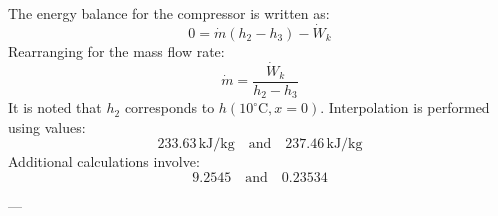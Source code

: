 The energy balance for the compressor is written as:  
\[
0 = \dot{m} (h_2 - h_3) - \dot{W}_k
\]  
Rearranging for the mass flow rate:  
\[
\dot{m} = \frac{\dot{W}_k}{h_2 - h_3}
\]  
It is noted that \( h_2 \) corresponds to \( h(10^\circ\text{C}, x = 0) \). Interpolation is performed using values:  
\[
233.63 \, \text{kJ/kg} \quad \text{and} \quad 237.46 \, \text{kJ/kg}
\]  
Additional calculations involve:  
\[
9.2545 \quad \text{and} \quad 0.23534
\]  

---